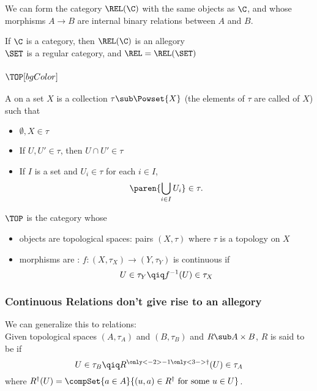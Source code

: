 {\begin{frame}[fragile]
        \vspace{0.5cm}

        We can form the category $\REL(\C)$ with the same objects as $\C$, and whose morphisms $A\to B$ are internal binary relations between $A$ and $B$.\pause

         If $\C$ is a  category, then $\REL(\C)$ is an allegory\\ \pause
         $\SET$ is a regular category, and $\REL=\REL(\SET)$
    \end{frame}


    \begin{frame}
        \frametitle{$\TOP[bgColor]$}
        {\large
         A  on a set $X$ is a collection $\tau\sub\Powset{X}$ (the elements of $\tau$ are called  of $X$) \pause such that
         \begin{itemize}
            \item $\emptyset, X\in \tau$
            \item If $U,U'\in\tau$, then $U\cap U'\in \tau$
            \item If $I$ is a set and $U_i\in\tau$ for each $i\in I$,
                \[ \paren{\bigcup_{i\in I}U_i}\in \tau. \]
        \end{itemize}
        \pause

         $\TOP$ is the category whose
        \begin{itemize}
            \item objects are topological spaces: pairs $(X,\tau)$ where $\tau$ is a topology on $X$
            \item morphisms are : \pause $f:(X,\tau_X)\to(Y,\tau_Y)$ is continuous if
                \[ U\in\tau_Y \qiq f^{-1}(U)\in\tau_X \]
        \end{itemize}
        }
    \end{frame}

    \begin{frame}
        \frametitle{Continuous Relations don't give rise to an allegory}
        We can generalize this to relations:\\ \pause
         Given topological spaces $(A,\tau_A)$ and $(B,\tau_B)$ and $R\sub A\times B$, $R$ is said to be  if
            \[ U\in\tau_B \qiq  R^{\only<-2>{-1}\only<3->{\dagger}}(U)\in\tau_A \]\pause
        {\normalsize where $R^{\dagger}(U)=\compSet{a\in A}{(u,a)\in R^{\dagger}\text{ for some }u\in U}$.}\pause


\end{frame}}
